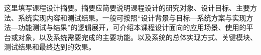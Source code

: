 
\begin{cabstract}
这里填写课程设计摘要。摘要应简要说明课程设计的研究对象、设计目标、主要方法、系统实现内容和测试结果。一般可按照“设计背景与目标—系统方案与实现方法—功能测试与结果”的逻辑展开，可介绍本课程设计面向的应用场景、使用的平台或对象，以及系统需要完成的主要功能。以及系统的总体实现方式、关键模块、测试结果和最终达到的效果。
\end{cabstract}